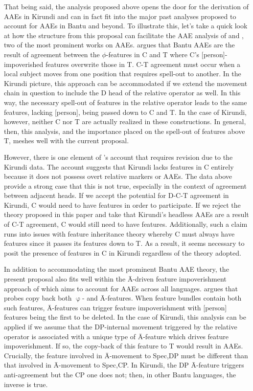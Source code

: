 \documentclass[output=paper,colorlinks,citecolor=brown
]{langscibook}
\begin{document}
That being said, the analysis proposed above opens the door for the derivation of AAEs in Kirundi and can in fact fit into the major past analyses proposed to account for AAEs in Bantu and beyond. To illustrate this, let's take a quick look at how the structure from this proposal can facilitate the AAE analysis of \citet{BHenderson:2013} and \citet{Baier:2018}, two of the most prominent works on AAEs. \citet{BHenderson:2013} argues that Bantu AAEs are the result of agreement between the $\phi$-features in C and T where C's [person]-impoverished features overwrite those in T. C-T agreement must occur when a local subject moves from one position that requires spell-out to another. In the Kirundi picture, this approach can be accommodated if we extend the movement chain in question to include the D head of the relative operator as well. In this way, the necessary spell-out of features in the relative operator leads to the same features, lacking [person], being passed down to C and T. In the case of Kirundi, however, neither C nor T are actually realized in these constructions. In general, then, this analysis, and the importance placed on the spell-out of features above T, meshes well with the current proposal.

However, there is one element of \citeauthor{BHenderson:2013}'s account that requires revision due to the Kirundi data. The account suggests that Kirundi lacks features in C entirely because it does not possess overt relative markers or AAEs. The data above provide a strong case that this is not true, especially in the context of agreement between adjacent heads. If we accept the potential for D-C-T agreement in Kirundi, C would need to have features in order to participate. If we reject the theory proposed in this paper and take that Kirundi's headless AAEs are a result of C-T agreement, C would still need to have features. Additionally, such a claim runs into issues with feature inheritance theory \citep{Chomsky:2008} whereby C must always have features since it passes its features down to T. As a result, it seems necessary to posit the presence of features in C in Kirundi regardless of the theory adopted.

In addition to accommodating the most prominent Bantu AAE theory, the present proposal also fits well within the Ā-driven feature impoverishment approach of \citet{Baier:2018} which aims to account for AAEs across all languages. \citeauthor{Baier:2018} argues that probes copy back both $\upvarphi$- and Ā-features. When feature bundles contain both such features, Ā-features can trigger feature impoverishment with [person] features being the first to be deleted. In the case of Kirundi, this analysis can be applied if we assume that the DP-internal movement triggered by the relative operator is associated with a unique type of Ā-feature which drives feature impoverishment. If so, the copy-back of this feature to T would result in AAEs. Crucially, the feature involved in Ā-movement to Spec,DP must be different than that involved in Ā-movement to Spec,CP. In Kirundi, the DP Ā-feature triggers anti-agreement but the CP one does not; then, in other Bantu languages, the inverse is true.
\end{document}
